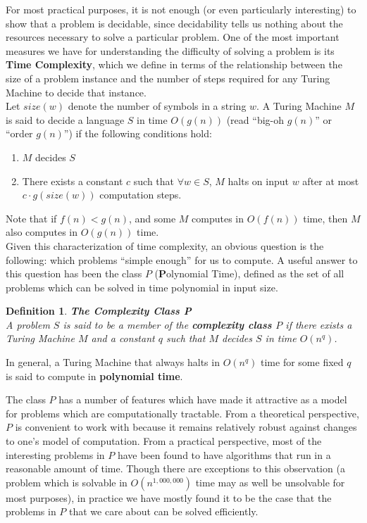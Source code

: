 \documentclass{article}
\newtheorem{definition}{Definition}[section]
\begin{document}
For most practical purposes, it is not enough (or even particularly
interesting) to show that a problem is decidable, since decidability
tells us nothing about the resources necessary to solve a particular
problem.  One of the most important measures we have for
understanding the difficulty of solving a problem is its
\textbf{Time Complexity}, which we define in terms of the
relationship between the size of a problem instance and the number
of steps required for any Turing Machine to decide that instance.
\\

Let $size(w)$ denote the number of symbols in a string $w$.  A Turing
Machine $M$ is said to decide a language $S$ in time $O(g(n))$ (read
``big-oh $g(n)$'' or ``order $g(n)$'') if the following conditions
hold:

\begin{enumerate}
\item $M$ decides $S$
\item There exists a constant $c$ such that $\forall w \in S$, $M$ halts on
  input $w$ after at most $c \cdot g(size(w))$ computation steps.
\end{enumerate}

Note that if $f(n) < g(n)$, and some $M$
computes in $O(f(n))$ time, then $M$ also computes in $O(g(n))$
time.\\

Given this characterization of time complexity, an obvious question is
the following: which problems ``simple enough'' for us to compute. A
useful answer to this question has been the class $P$
(\textbf{P}olynomial Time), defined as the set of all problems which
can be solved in time
polynomial in input size. \\

\begin{definition}{\textbf{The Complexity Class P}}\\

  A problem $S$ is said to be a member of the \textbf{complexity
    class $P$} if there exists a Turing Machine $M$ and a constant
  $q$ such that $M$ decides $S$ in time $O(n^q)$.
\end{definition}

In general, a Turing Machine that always halts in $O(n^q)$ time for
some fixed $q$ is said to compute in \textbf{polynomial time}.

The class $P$ has a number of features which have made it attractive
as a model for problems which are computationally tractable.  From a
theoretical perspective, $P$ is convenient to work with because it
remains relatively robust against changes to one's model of
computation.  From a practical perspective, most of the interesting
problems in $P$ have been found to have algorithms that run in a
reasonable amount of time.  Though there are exceptions to this
observation (a problem which is solvable in $O(n^{1,000,000})$ time
may as well be unsolvable for most purposes), in practice we have
mostly found it to be the case that the problems in $P$ that we care
about can be solved efficiently.
\end{document}
